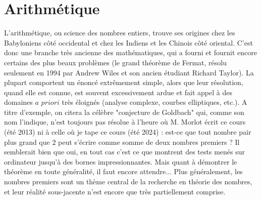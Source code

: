 \documentclass[french]{book}
\theoremstyle{plain}
\theoremstyle{definition}
\theoremstyle{remark}
\begin{document}
\chapter{Arithmétique}
L'arithmétique, ou science des nombres entiers, trouve ses origines chez les Babyloniens côté occidental et chez les Indiens et les Chinois côté oriental. C'est donc une branche très ancienne des mathématiques, qui a fourni et fournit encore certains des plus beaux problèmes (le grand théorème de Fermat, résolu seulement en 1994 par Andrew Wiles et son ancien étudiant Richard Taylor). La plupart comportent un énoncé extrêmement simple, alors que leur résolution, quand elle est connue, est souvent excessivement ardue et fait appel à des domaines $a$ $priori$ très éloignés (analyse complexe, courbes elliptiques, etc.). A titre d'exemple, on citera la célèbre "conjecture de Goldbach" qui, comme son nom l'indique, n'est toujours pas résolue à l'heure où M. Morlot écrit ce cours (été 2013) ni à celle où je tape ce cours (été 2024) : est-ce que tout nombre pair plus grand que $2$ peut s'écrire comme somme de deux nombres premiers ? Il semblerait bien que oui, en tout cas c'est ce que montrent des tests menés sur ordinateur jusqu'à des bornes impressionnantes. Mais quant à démontrer le théorème en toute généralité, il faut encore attendre... Plus généralement, les nombres premiers sont un thème central de la recherche en théorie des nombres, et leur réalité sous-jacente n'est encore que très partiellement comprise.
\end{document}
